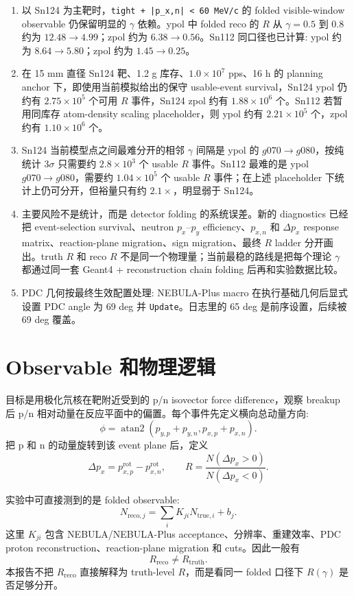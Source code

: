 \documentclass[a4paper,11pt]{article}
\begin{document}
\begin{enumerate}
  \item 以 Sn124 为主靶时，\texttt{tight + |p\_x,n| < 60 MeV/c} 的 folded visible-window observable 仍保留明显的 $\gamma$ 依赖。ypol 中 folded reco 的 $R$ 从 $\gamma=0.5$ 到 $0.8$ 约为 $12.48 \to 4.99$；zpol 约为 $6.38 \to 0.56$。Sn112 同口径也已计算: ypol 约为 $8.64 \to 5.80$；zpol 约为 $1.45 \to 0.25$。
  \item 在 15 mm 直径 Sn124 靶、1.2 g 库存、$1.0\times 10^7$ pps、16 h 的 planning anchor 下，即使用当前模拟给出的保守 usable-event survival，Sn124 ypol 仍约有 $2.75\times 10^5$ 个可用 $R$ 事件，Sn124 zpol 约有 $1.88\times 10^6$ 个。Sn112 若暂用同库存 atom-density scaling placeholder，则 ypol 约有 $2.21\times10^5$ 个，zpol 约有 $1.10\times10^6$ 个。
  \item Sn124 当前模型点之间最难分开的相邻 $\gamma$ 间隔是 ypol 的 $g070 \to g080$，按纯统计 3$\sigma$ 只需要约 $2.8\times 10^3$ 个 usable $R$ 事件。Sn112 最难的是 ypol $g070 \to g080$，需要约 $1.04\times10^5$ 个 usable $R$ 事件；在上述 placeholder 下统计上仍可分开，但裕量只有约 $2.1\times$，明显弱于 Sn124。
  \item 主要风险不是统计，而是 detector folding 的系统误差。新的 diagnostics 已经把 event-selection survival、neutron $p_x$--$p_y$ efficiency、$p_{x,n}$ 和 $\Delta p_x$ response matrix、reaction-plane migration、sign migration、最终 $R$ ladder 分开画出。truth $R$ 和 reco $R$ 不是同一个物理量；当前最稳的路线是把每个理论 $\gamma$ 都通过同一套 Geant4 + reconstruction chain folding 后再和实验数据比较。
  \item PDC 几何按最终生效配置处理: NEBULA-Plus macro 在执行基础几何后显式设置 PDC angle 为 69 deg 并 \texttt{Update}。日志里的 65 deg 是前序设置，后续被 69 deg 覆盖。
\end{enumerate}

\section{Observable 和物理逻辑}

目标是用极化氘核在靶附近受到的 p/n isovector force difference，观察 breakup 后 p/n 相对动量在反应平面中的偏置。每个事件先定义横向总动量方向:
\[
  \phi = \operatorname{atan2}
  \left(
    p_{y,p}+p_{y,n},
    p_{x,p}+p_{x,n}
  \right).
\]
把 p 和 n 的动量旋转到该 event plane 后，定义
\[
  \Delta p_x = p_{x,p}^{\mathrm{rot}} - p_{x,n}^{\mathrm{rot}},
  \qquad
  R = \frac{N(\Delta p_x > 0)}{N(\Delta p_x < 0)}.
\]

实验中可直接测到的是 folded observable:
\[
  N_{\mathrm{reco},j}
  =
  \sum_i K_{ji} N_{\mathrm{true},i} + b_j .
\]
这里 $K_{ji}$ 包含 NEBULA/NEBULA-Plus acceptance、分辨率、重建效率、PDC proton reconstruction、reaction-plane migration 和 cuts。因此一般有
\[
  R_{\mathrm{reco}} \ne R_{\mathrm{truth}}.
\]
本报告不把 $R_{\mathrm{reco}}$ 直接解释为 truth-level $R$，而是看同一 folded 口径下 $R(\gamma)$ 是否足够分开。
\end{document}
